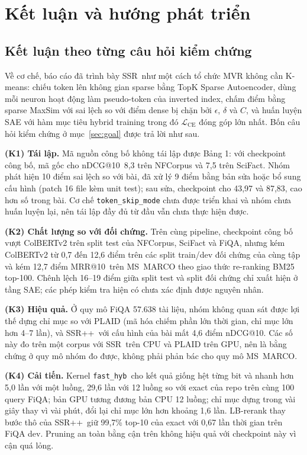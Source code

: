 \documentclass[a4paper,13pt]{extreport}
\makeatletter
\theoremstyle{plain}
\newcommand{\ssr}{SSR}
\newcommand{\ssrpp}{SSR++}
\newcommand{\ndcg}{nDCG@10}
\newcommand{\mrr}{MRR@10}
\newcommand{\fasthyb}{\texttt{fast\_hyb}}
\makeatother
\begin{document}
\section{Kết luận và hướng phát triển}
\label{sec:conclusion}
\subsection{Kết luận theo từng câu hỏi kiểm chứng}
Về cơ chế, báo cáo đã trình bày \ssr\ như một cách tổ chức MVR không cần K-means: chiếu token lên không gian sparse bằng TopK Sparse Autoencoder, dùng mỗi neuron hoạt động làm pseudo-token của inverted index, chấm điểm bằng sparse MaxSim với sai lệch so với điểm dense bị chặn bởi $\epsilon$, $\delta$ và $C$, và huấn luyện SAE với hàm mục tiêu hybrid training trong đó $\mathcal{L}_{\mathrm{CE}}$ đóng góp lớn nhất. Bốn câu hỏi kiểm chứng ở mục~\ref{sec:goal} được trả lời như sau.

\textbf{(K1) Tái lập.} Mã nguồn công bố không tái lập được Bảng 1: với checkpoint công bố, mã gốc cho \ndcg\ 8,3 trên NFCorpus và 7,5 trên SciFact. Nhóm phát hiện 10 điểm sai lệch so với bài, đã xử lý 9 điểm bằng bản sửa hoặc bổ sung cấu hình (patch 16 file kèm unit test); sau sửa, checkpoint cho 43,97 và 87,83, cao hơn số trong bài. Cơ chế \texttt{token\_skip\_mode} chưa được triển khai và nhóm chưa huấn luyện lại, nên tái lập đầy đủ từ đầu vẫn chưa thực hiện được.

\textbf{(K2) Chất lượng so với đối chứng.} Trên cùng pipeline, checkpoint công bố vượt ColBERTv2 trên split test của NFCorpus, SciFact và FiQA, nhưng kém ColBERTv2 từ 0,7 đến 12,6 điểm trên các split train/dev đối chứng của cùng tập và kém 12,7 điểm \mrr\ trên MS~MARCO theo giao thức re-ranking BM25 top-100. Chênh lệch 16--19 điểm giữa split test và split đối chứng chỉ xuất hiện ở tầng SAE; các phép kiểm tra hiện có chưa xác định được nguyên nhân.

\textbf{(K3) Hiệu quả.} Ở quy mô FiQA 57.638 tài liệu, nhóm không quan sát được lợi thế dựng chỉ mục so với PLAID (mã hóa chiếm phần lớn thời gian, chỉ mục lớn hơn 4--7 lần), và \ssrpp\ với cấu hình của bài mất 4,6 điểm \ndcg. Các số này đo trên một corpus với \ssr\ trên CPU và PLAID trên GPU, nên là bằng chứng ở quy mô nhóm đo được, không phải phản bác cho quy mô MS~MARCO.

\textbf{(K4) Cải tiến.} Kernel \fasthyb\ cho kết quả giống hệt từng bit và nhanh hơn 5,0 lần với một luồng, 29,6 lần với 12 luồng so với exact của repo trên cùng 100 query FiQA; bản GPU tương đương bản CPU 12 luồng; chỉ mục dựng trong vài giây thay vì vài phút, đổi lại chỉ mục lớn hơn khoảng 1,6 lần. LB-rerank thay bước thô của \ssrpp\ giữ 99,7\% top-10 của exact với 0,67 lần thời gian trên FiQA dev. Pruning an toàn bằng cận trên không hiệu quả với checkpoint này vì cận quá lỏng.
\end{document}

